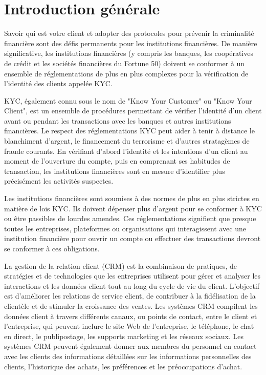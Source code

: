 \let\cleardoublepage\clearpage

\chapter{Introduction générale}
\label{sec:DescriptionDuProjet}

Savoir qui est votre client et adopter des protocoles pour prévenir la criminalité financière sont des défis permanents pour les institutions financières. De manière significative, les institutions financières (y compris les banques, les coopératives de crédit et les sociétés financières du Fortune 50) doivent se conformer à un ensemble de réglementations de plus en plus complexes pour la vérification de l'identité des clients appelée KYC.

KYC, également connu sous le nom de "Know Your Customer" ou "Know Your Client", est un ensemble de procédures permettant de vérifier l'identité d'un client avant ou pendant les transactions avec les banques et autres institutions financières. Le respect des réglementations KYC peut aider à tenir à distance le blanchiment d'argent, le financement du terrorisme et d'autres stratagèmes de fraude courants. En vérifiant d'abord l'identité et les intentions d'un client au moment de l'ouverture du compte, puis en comprenant ses habitudes de transaction, les institutions financières sont en mesure d'identifier plus précisément les activités suspectes. 

Les institutions financières sont soumises à des normes de plus en plus strictes en matière de lois KYC. Ils doivent dépenser plus d'argent pour se conformer à KYC ou être passibles de lourdes amendes. Ces réglementations signifient que presque toutes les entreprises, plateformes ou organisations qui interagissent avec une institution financière pour ouvrir un compte ou effectuer des transactions devront se conformer à ces obligations.

La gestion de la relation client (CRM) est la combinaison de pratiques, de stratégies et de technologies que les entreprises utilisent pour gérer et analyser les interactions et les données client tout au long du cycle de vie du client. L'objectif est d'améliorer les relations de service client, de contribuer à la fidélisation de la clientèle et de stimuler la croissance des ventes. Les systèmes CRM compilent les données client à travers différents canaux, ou points de contact, entre le client et l'entreprise, qui peuvent inclure le site Web de l'entreprise, le téléphone, le chat en direct, le publipostage, les supports marketing et les réseaux sociaux. Les systèmes CRM peuvent également donner aux membres du personnel en contact avec les clients des informations détaillées sur les informations personnelles des clients, l'historique des achats, les préférences et les préoccupations d'achat.


